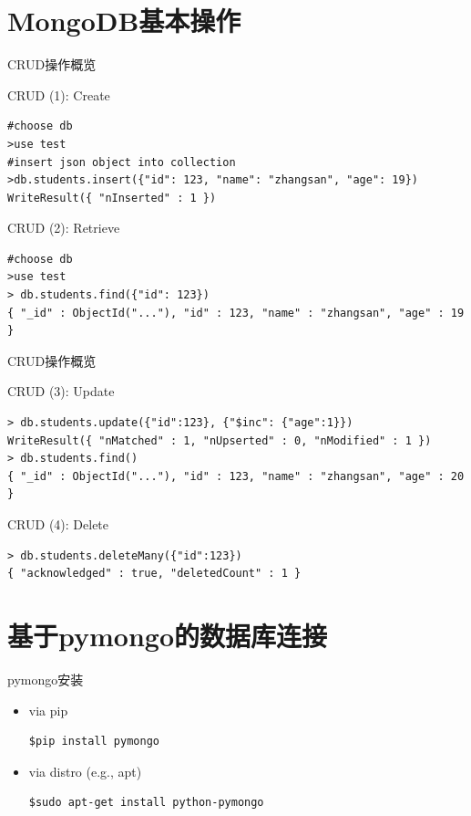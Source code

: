 \documentclass{beamer}
\begin{document}
\section{MongoDB基本操作}
\begin{frame}[t,fragile]{CRUD操作概览}
\begin{block}{CRUD (1): Create}
	\scriptsize
\begin{verbatim}
#choose db
>use test
#insert json object into collection
>db.students.insert({"id": 123, "name": "zhangsan", "age": 19})
WriteResult({ "nInserted" : 1 })
\end{verbatim}
\end{block}
\begin{block}{CRUD (2): Retrieve}
	\scriptsize
\begin{verbatim}
#choose db
>use test
> db.students.find({"id": 123})
{ "_id" : ObjectId("..."), "id" : 123, "name" : "zhangsan", "age" : 19 }

\end{verbatim}
\end{block}
\end{frame}
\begin{frame}[t,fragile]{CRUD操作概览}
\begin{block}{CRUD (3): Update}
	\scriptsize
\begin{verbatim}
> db.students.update({"id":123}, {"$inc": {"age":1}})
WriteResult({ "nMatched" : 1, "nUpserted" : 0, "nModified" : 1 })
> db.students.find()
{ "_id" : ObjectId("..."), "id" : 123, "name" : "zhangsan", "age" : 20 }
\end{verbatim}
\end{block}
\begin{block}{CRUD (4): Delete}
	\scriptsize
\begin{verbatim}
> db.students.deleteMany({"id":123})
{ "acknowledged" : true, "deletedCount" : 1 }

\end{verbatim}
\end{block}
\end{frame}

\section{基于pymongo的数据库连接}
\begin{frame}[t,fragile]{pymongo安装}
	\begin{block}{}
		\begin{itemize}
			\item via pip
\begin{verbatim}
$pip install pymongo
\end{verbatim}
			\item via distro (e.g., apt)
\begin{verbatim}
$sudo apt-get install python-pymongo
\end{verbatim}
		\end{itemize}
	\end{block}
\end{frame}
\end{document}
